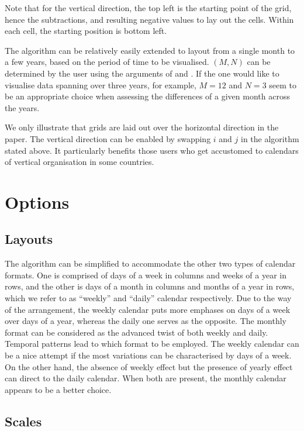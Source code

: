 \documentclass[article]{jss}
\begin{document}
Note that for the vertical direction, the top left is the starting point
of the grid, hence the subtractions, and resulting negative values to
lay out the cells. Within each cell, the starting position is bottom
left.

The algorithm can be relatively easily extended to layout from a single
month to a few years, based on the period of time to be visualised.
\((M, N)\) can be determined by the user using the arguments of
 and . If the one would like to visualise data
spanning over three years, for example, \(M = 12\) and \(N = 3\) seem to
be an appropriate choice when assessing the differences of a given month
across the years.

We only illustrate that grids are laid out over the horizontal direction
in the paper. The vertical direction can be enabled by swapping \(i\)
and \(j\) in the algorithm stated above. It particularly benefits those
users who get accustomed to calendars of vertical organisation in some
countries.

\section{Options}\label{options}

\subsection{Layouts}\label{layouts}

The algorithm can be simplified to accommodate the other two types of
calendar formats. One is comprised of days of a week in columns and
weeks of a year in rows, and the other is days of a month in columns and
months of a year in rows, which we refer to as ``weekly'' and ``daily''
calendar respectively. Due to the way of the arrangement, the weekly
calendar puts more emphases on days of a week over days of a year,
whereas the daily one serves as the opposite. The monthly format can be
considered as the advanced twist of both weekly and daily. Temporal
patterns lead to which format to be employed. The weekly calendar can be
a nice attempt if the most variations can be characterised by days of a
week. On the other hand, the absence of weekly effect but the presence
of yearly effect can direct to the daily calendar. When both are
present, the monthly calendar appears to be a better choice.

\subsection{Scales}\label{scales}
\end{document}
